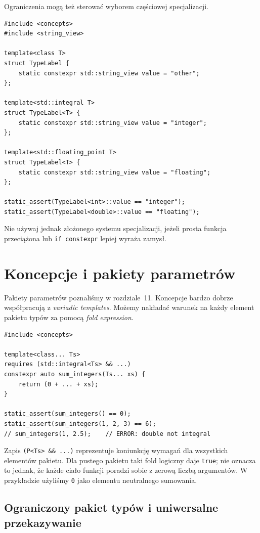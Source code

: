 Ograniczenia mogą też sterować wyborem częściowej specjalizacji.

\begin{lstlisting}
#include <concepts>
#include <string_view>

template<class T>
struct TypeLabel {
    static constexpr std::string_view value = "other";
};

template<std::integral T>
struct TypeLabel<T> {
    static constexpr std::string_view value = "integer";
};

template<std::floating_point T>
struct TypeLabel<T> {
    static constexpr std::string_view value = "floating";
};

static_assert(TypeLabel<int>::value == "integer");
static_assert(TypeLabel<double>::value == "floating");
\end{lstlisting}

Nie używaj jednak złożonego systemu specjalizacji, jeżeli
prosta funkcja przeciążona lub \texttt{if constexpr}
lepiej wyraża zamysł.

\section{Koncepcje i pakiety parametrów}
\label{sec:concepts-variadic}

Pakiety parametrów poznaliśmy w rozdziale~11.
Koncepcje bardzo dobrze współpracują z \emph{variadic templates}.
Możemy nakładać warunek na każdy element pakietu typów
za pomocą \emph{fold expression}.

\begin{lstlisting}
#include <concepts>

template<class... Ts>
requires (std::integral<Ts> && ...)
constexpr auto sum_integers(Ts... xs) {
    return (0 + ... + xs);
}

static_assert(sum_integers() == 0);
static_assert(sum_integers(1, 2, 3) == 6);
// sum_integers(1, 2.5);    // ERROR: double not integral
\end{lstlisting}

Zapis \texttt{(P<Ts> \&\& ...)} reprezentuje
koniunkcję wymagań dla wszystkich elementów pakietu.
Dla pustego pakietu taki fold logiczny daje \texttt{true};
nie oznacza to jednak, że każde ciało funkcji poradzi sobie
z zerową liczbą argumentów. W przykładzie użyliśmy
\texttt{0} jako elementu neutralnego sumowania.

\subsection{Ograniczony pakiet typów i uniwersalne przekazywanie}

